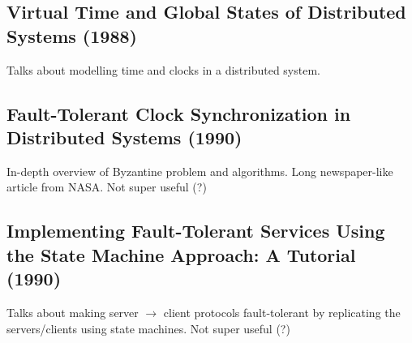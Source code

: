 \documentclass{article}
\begin{document}
\subsection*{Virtual Time and Global States of Distributed Systems (1988)}
Talks about modelling time and clocks in a distributed system.

\subsection*{Fault-Tolerant Clock Synchronization in Distributed Systems (1990)}
In-depth overview of Byzantine problem and algorithms. Long newspaper-like article from NASA. Not super useful (?)

\subsection*{Implementing Fault-Tolerant Services Using the State Machine Approach: A Tutorial (1990)}
Talks about making server $\to$ client protocols fault-tolerant by replicating the servers/clients using state machines. Not super useful (?)
\end{document}
